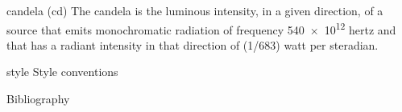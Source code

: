 \documentclass[avery5371,grid]{flashcards}
\begin{document}
\begin{flashcard}[Definitions]{candela (cd)}
\vspace{\fill}
The candela is the luminous intensity, in a given direction, of a source that emits monochromatic radiation of frequency \num{540e12} hertz and that has a radiant intensity in that direction of (1/683) watt per steradian.\cite{sp330}
\vspace{\fill}
\end{flashcard}


\begin{flashcard}[Definitions]{style}
\vspace{\fill}
Style conventions \cite{sp811}
\vspace{\fill}
\end{flashcard}


\begin{flashcard}[]{Bibliography}
    \printbibliography
\end{flashcard}
\end{document}
